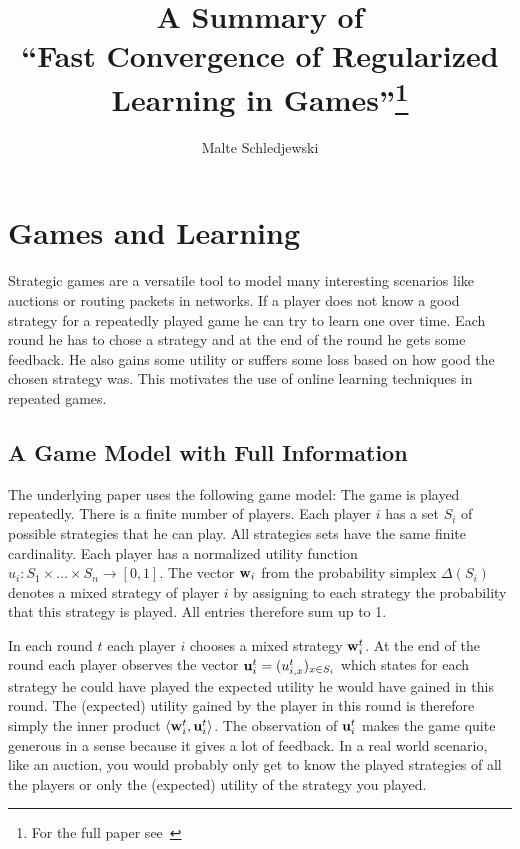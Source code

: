 \documentclass[a4paper]{article}
\title{A Summary of \\ \enquote{Fast Convergence of Regularized
    Learning in Games}\footnote{For the full paper see~\cite[]{2015arXiv150700407S}}}
\author{Malte Schledjewski}
\theoremstyle{definition}
\newcommand{\mst}{\ensuremath{w}}
\renewcommand{\vec}[1]{\ensuremath{{\bf #1}}}
\newcommand{\dotp}[2]{\ensuremath{\left\langle #1, #2 \right\rangle}}
\begin{document}

\setlength{\parskip}{0pt plus0pt minus3pt}



\maketitle

\section{Games and Learning}

Strategic games are a versatile tool to model many interesting scenarios like auctions or routing
packets in networks.
If a player does not know a good strategy for a repeatedly played
game he can try to learn one over time.
Each round he has to chose a strategy and at the end of the round he
gets some feedback.
He also gains some utility or suffers some loss based on how good the
chosen strategy was.
This motivates the use of online learning techniques in repeated games.




\subsection{A Game Model with Full Information}
The underlying paper uses the following game model:
The game is played repeatedly.
There is a finite number of players.
Each player $i$ has a set $S_i$ of possible strategies that he can play.
All strategies sets have the same finite cardinality.
Each player has a normalized utility function
$u_i: S_1\times \ldots \times S_n \rightarrow [0,1]$.
 The vector $\vec{w}_i$ from the probability simplex $\Delta(S_i)$
 denotes a mixed strategy of player $i$ by assigning to each strategy the probability that this
 strategy is played. All entries therefore sum up to 1. 

In each round $t$ each player $i$ chooses a mixed strategy $\vec{\mst}_i^t$.
At the end of the round each player observes the vector $\vec{u}_i^t =
(u_{i,x}^t)_{x\in S_i}$
which states for each strategy he could have played the expected
utility he would have gained in this round.
The (expected) utility gained by the player in this round is therefore simply the
inner product $\dotp{ \vec{\mst}_i^t}{\vec{u}_i^t}$.
The observation of $\vec{u}_i^t$ makes the game quite generous in a sense because it gives a lot
of feedback. In a real world scenario, like an auction, you would
probably only get to know the played strategies of all the players or
only the (expected) utility of the strategy you played.
\end{document}
